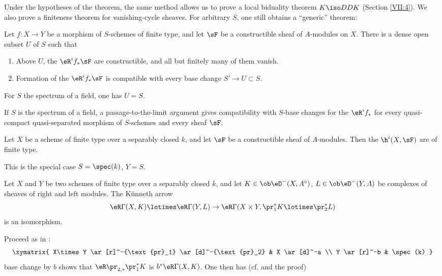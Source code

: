\documentclass[oneside]{book}
\begin{document}
Under the hypotheses of the theorem, the same method allows us to prove a
local biduality theorem $K\iso D D K$ (Section \ref{VII:4}). We also prove a
finiteness theorem for vanishing-cycle sheaves. For arbitrary $S$, one still
obtains a ``generic'' theorem:






\begin{theorem_}\label{VII:1-9}
Let $f:X\to Y$ be a morphism of $S$-schemes of finite type, and let $\sF$ be
a constructible sheaf of $A$-modules on $X$. There is a dense open subset
$U$ of $S$ such that
\begin{enumerate}[\indent (i)]
  \item Above $U$, the $\eR^i f_\ast \sF$ are constructible, and all but
    finitely many of them vanish.
  \item Formation of the $\eR^i f_\ast \sF$ is compatible with every base
    change $S' \to U\subset S$.
\end{enumerate}
\end{theorem_}

For $S$ the spectrum of a field, one has $U=S$.

If $S$ is the spectrum of a field, a passage-to-the-limit argument gives
compatibility with $S$-base changes for the $\eR^i f_\ast$ for every
quasi-compact quasi-separated morphism of $S$-schemes and every sheaf $\sF$.






\begin{corollary_}\label{VII:1-10}
Let $X$ be a scheme of finite type over a separably closed $k$, and let
$\sF$ be a constructible sheaf of $A$-modules. Then the $\h^i(X,\sF)$ are of
finite type.
\end{corollary_}

This is the special case $S=\spec(k)$, $Y=S$.

\begin{corollary_}\label{VII:1-11}
Let $X$ and $Y$ be two schemes of finite type over a separably closed $k$,
and let $K\in \ob\eD^-(X,A^\circ)$,
$L\in \ob\eD^-(Y,A)$ be complexes of sheaves of right and left modules. The
K\"unneth arrow
\[
  \eR \Gamma(X,K) \lotimes \eR \Gamma(Y,L) \to \eR\Gamma(X\times Y,\pr_1^\ast K \lotimes \pr_2^\ast L)
\]
is an isomorphism.
\end{corollary_}

Proceed as in \cite[XVII 5.4.3]{sga4}:
\[\xymatrix{
  X\times Y \ar[r]^-{\text{pr}_1} \ar[d]^-{\text{pr}_2}
    & X \ar[d]^-a \\
  Y \ar[r]^-b
    & \spec(k)
}\]
base change by $b$ shows that $\eR\pr_{2,\ast}{} \pr_1^\ast K$ is
$b^\ast \eR\Gamma(X,K)$. One then has (cf.
\cite[XVII 5.2.11]{sga4} and the proof)
\end{document}
